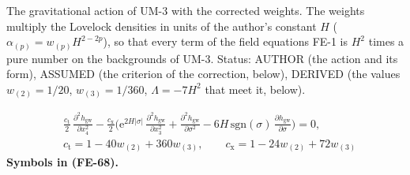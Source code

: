 \documentclass[
  10pt,
]{article}
\begin{document}
The gravitational action of UM-3 with the corrected weights. The weights
multiply the Lovelock densities in units of the author's constant \(H\)
(\(\alpha_{(p)} = w_{(p)}H^{2-2p}\)), so that every term of the field
equations FE-1 is \(H^2\) times a pure number on the backgrounds of
UM-3. Status: AUTHOR (the action and its form), ASSUMED (the criterion
of the correction, below), DERIVED (the values \(w_{(2)} = 1/20\),
\(w_{(3)} = 1/360\), \(\Lambda = -7H^2\) that meet it, below).

\[
\begin{aligned}
&\frac{c_{\mathrm{t}}}{2}\,\frac{\partial^2h_{\mathrm{gw}}}{\partial x_4^2}
 - \frac{c_{\mathrm{x}}}{2}\Big(\mathrm{e}^{2H\lvert\sigma\rvert}\,\frac{\partial^2h_{\mathrm{gw}}}{\partial x_3^2}
 + \frac{\partial^2h_{\mathrm{gw}}}{\partial\sigma^2} - 6H\,\mathrm{sgn}(\sigma)\,\frac{\partial h_{\mathrm{gw}}}{\partial\sigma}\Big) = 0,\\
&c_{\mathrm{t}} = 1 - 40w_{(2)} + 360w_{(3)},\qquad c_{\mathrm{x}} = 1 - 24w_{(2)} + 72w_{(3)}
\end{aligned} \tag{FE-68}
\] \textbf{Symbols in (FE-68).}
\end{document}
